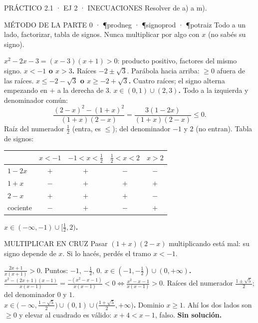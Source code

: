 \begin{enunciado}{PRÁCTICO 2.1 · EJ 2 · INECUACIONES}
Resolver de a) a m).
\end{enunciado}
\begin{uso}{MÉTODO DE LA PARTE 0 · \P{prodneg} · \P{signoprod} · \P{potraiz}}
Todo a un lado, factorizar, tabla de signos. Nunca multiplicar por algo con $x$ (no sabés su signo).
\end{uso}
$x^2-2x-3=(x-3)(x+1)>0$: producto positivo, factores del mismo signo. \textbf{$x<-1$ o $x>3$.}
Raíces $-2\pm\sqrt3$. Parábola hacia arriba: $\ge0$ afuera de las raíces. \textbf{$x\le-2-\sqrt3$ o $x\ge-2+\sqrt3$.}
Cuatro raíces; el signo alterna empezando en $+$ a la derecha de 3. \textbf{$x\in(0,1)\cup(2,3)$.}
Todo a la izquierda y denominador común:
\[\frac{(2-x)^2-(1+x)^2}{(1+x)(2-x)}=\frac{3(1-2x)}{(1+x)(2-x)}\le0.\]
Raíz del numerador $\frac12$ (entra, es $\le$); del denominador $-1$ y $2$ (no entran). Tabla de signos:
\begin{center}\small
\begin{tabular}{@{}lcccc@{}}
& $x<-1$ & $-1<x<\frac12$ & $\frac12<x<2$ & $x>2$\\\midrule
$1-2x$ & $+$ & $+$ & $-$ & $-$\\
$1+x$ & $-$ & $+$ & $+$ & $+$\\
$2-x$ & $+$ & $+$ & $+$ & $-$\\
cociente & $-$ & $+$ & $-$ & $+$
\end{tabular}
\end{center}
\textbf{$x\in(-\infty,-1)\cup[\frac12,2)$.}
\begin{trampa}{MULTIPLICAR EN CRUZ}
Pasar $(1+x)(2-x)$ multiplicando está mal: su signo depende de $x$. Si lo hacés, perdés el tramo $x<-1$.
\end{trampa}
$\frac{2x+1}{x(x+1)}>0$. Puntos: $-1$, $-\frac12$, $0$. \textbf{$x\in(-1,-\frac12)\cup(0,+\infty)$.}
$\frac{x^2-(2x+1)(x-1)}{x(x-1)}=\frac{-(x^2-x-1)}{x(x-1)}<0\iff\frac{x^2-x-1}{x(x-1)}>0$. Raíces del numerador $\frac{1\pm\sqrt5}2$; del denominador $0$ y $1$.\\
\textbf{$x\in\big(-\infty,\frac{1-\sqrt5}2\big)\cup(0,1)\cup\big(\frac{1+\sqrt5}2,+\infty\big)$.}
Dominio $x\ge1$. Ahí los dos lados son $\ge0$ y elevar al cuadrado es válido: $x+4<x-1$, falso. \textbf{Sin solución.}
